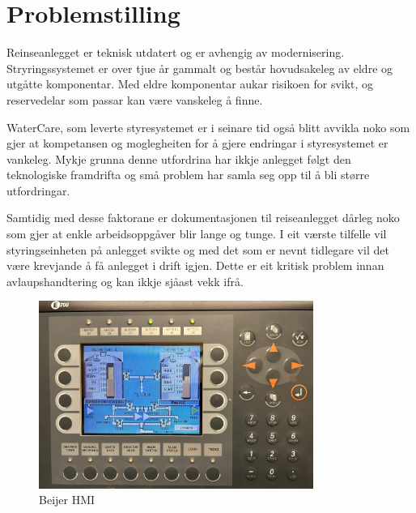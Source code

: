 \section{Problemstilling}
Reinseanlegget er teknisk utdatert og er avhengig av modernisering. Stryringssystemet er over tjue år gammalt
og består hovudsakeleg av eldre og utgåtte komponentar. Med eldre komponentar aukar risikoen for svikt, 
og reservedelar som passar kan være vanskeleg å finne.

WaterCare, som leverte styresystemet er i seinare tid også blitt avvikla noko som gjer at kompetansen 
og moglegheiten for å gjere endringar i styresystemet er vankeleg. 
Mykje grunna denne utfordrina har ikkje anlegget følgt den teknologiske framdrifta 
og små problem har samla seg opp til å bli større utfordringar.

Samtidig med desse faktorane er dokumentasjonen til reiseanlegget dårleg noko som gjer at enkle arbeidsoppgåver blir lange og tunge.
I eit værste tilfelle vil styringseinheten på anlegget svikte og med det som er nevnt tidlegare vil det være krevjande
å få anlegget i drift igjen. Dette er eit kritisk problem innan avlaupshandtering og kan ikkje sjåast vekk ifrå.
\newline

\begin{figure}[htbp]
    \centering
    \includegraphics[width=0.8\textwidth]{Bilder/BeijerSkjerm.JPG}
    \caption{Beijer HMI}\label{fig:HMI}
\end{figure}